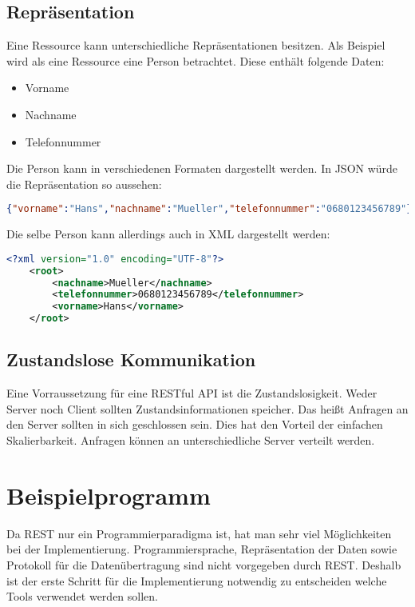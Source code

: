 \documentclass[listof=totoc]{article}
\begin{document}
	\subsection{Repräsentation}\label{subsec:Repraesentation}
	Eine Ressource kann unterschiedliche Repräsentationen besitzen.
	Als Beispiel wird als eine Ressource eine Person betrachtet. Diese enthält folgende Daten:
	\begin{itemize} 
		\setlength{\itemsep}{0pt} 
		\item Vorname
		\item Nachname
		\item Telefonnummer
	\end{itemize}
	Die Person kann in verschiedenen Formaten dargestellt werden. 
	In \ac{JSON} würde die Repräsentation so aussehen:
	

	\begin{lstlisting}[language=json,caption=\ac{JSON}-Repräsentation (application/json)]
		{"vorname":"Hans","nachname":"Mueller","telefonnummer":"0680123456789"}
	\end{lstlisting}
	
	Die selbe Person kann allerdings auch in \ac{XML} dargestellt werden:
	\begin{lstlisting}[language=XML,caption=\ac{XML}-Repräsentation (application/xml)]
	<?xml version="1.0" encoding="UTF-8"?>
	<root>
		<nachname>Mueller</nachname>
		<telefonnummer>0680123456789</telefonnummer>
		<vorname>Hans</vorname>
	</root>
	\end{lstlisting}
	\newpage
	
	
	\subsection{Zustandslose Kommunikation}
	Eine Vorraussetzung für eine \ac{REST}ful \ac{API} ist die Zustandslosigkeit. Weder Server noch Client sollten Zustandsinformationen speicher. Das heißt Anfragen an den Server sollten in sich geschlossen sein. Dies hat den Vorteil der einfachen Skalierbarkeit. Anfragen können an unterschiedliche Server verteilt werden. \cite[p.~6]{RESTBOOK}
	\newpage
	
	\section{Beispielprogramm}
	Da \ac{REST} nur ein Programmierparadigma ist, hat man sehr viel Möglichkeiten bei der Implementierung. Programmiersprache, Repräsentation der Daten sowie Protokoll für die Datenübertragung sind nicht vorgegeben durch \ac{REST}. Deshalb ist der erste Schritt für die Implementierung notwendig zu entscheiden welche Tools verwendet werden sollen.
\end{document}
